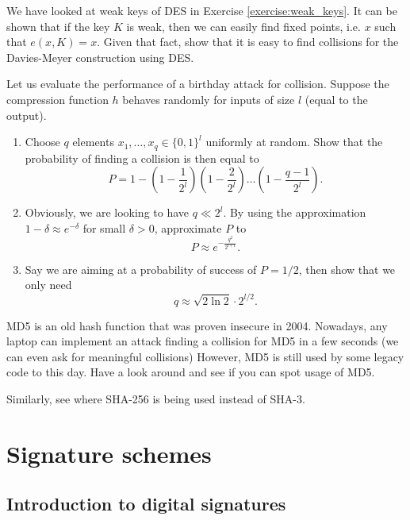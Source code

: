 \documentclass[a4paper, 11pt, openany]{book}
\begin{document}
\begin{exercise}
We have looked at weak keys of DES in Exercise \ref{exercise:weak_keys}. It can be shown that if the key $K$ is weak, then we can easily find fixed points, i.e. $x$ such that $e(x,K) = x$. Given that fact, show that it is easy to find collisions for the Davies-Meyer construction using DES.
\end{exercise}


\begin{exercise}
Let us evaluate the performance of a birthday attack for collision. Suppose the compression function $h$ behaves randomly for inputs of size $l$ (equal to the output).
\begin{enumerate}
\item Choose $q$ elements $x_1, \dots, x_q \in \{0,1\}^l$ uniformly at random. Show that the probability of finding a collision is then equal to
\[
    P = 1 - \left( 1 - \frac{1}{2^l} \right) \left( 1 - \frac{2}{2^l} \right) \dots \left( 1 - \frac{q-1}{2^l} \right).
\]

\item Obviously, we are looking to have $q \ll 2^l$. By using the approximation $1 - \delta \approx e^{-\delta}$ for small $\delta > 0$, approximate $P$ to
\[
    P \approx e^{- \frac{ q^2 }{ 2^{l+1} } }.
\]

\item Say we are aiming at a probability of success of $P  = 1/2$, then show that we only need
\[
    q \approx \sqrt{2 \ln 2} \cdot 2^{l/2}.
\]
\end{enumerate}
\end{exercise}




\begin{exercise}
MD5 is an old hash function that was proven insecure in 2004. Nowadays, any laptop can implement an attack finding a collision for MD5 in a few seconds (we can even ask for meaningful collisions) However, MD5 is still used by some legacy code to this day. Have a look around and see if you can spot usage of MD5.

Similarly, see where SHA-256 is being used instead of SHA-3.
\end{exercise}

\section{Signature schemes}
\label{sec:18}

\subsection{Introduction to digital signatures}
\end{document}
